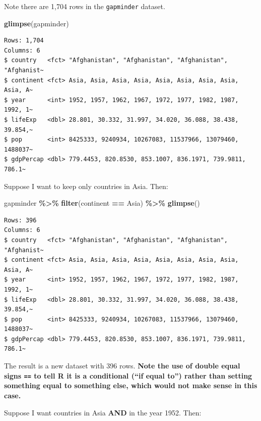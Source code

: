 \documentclass[
]{book}
\makeatletter
\newenvironment{Shaded}{\begin{snugshade}}{\end{snugshade}}
\newcommand{\FunctionTok}[1]{\textcolor[rgb]{0.27,0.27,0.27}{\textbf{#1}}}
\newcommand{\NormalTok}[1]{#1}
\newcommand{\SpecialCharTok}[1]{\textcolor[rgb]{0.43,0.43,0.43}{\textbf{#1}}}
\newcommand{\StringTok}[1]{\textcolor[rgb]{0.5,0.5,0.5}{#1}}
\newenvironment{kframe}{%
\medskip{}
\setlength{\fboxsep}{.8em}
 \def\at@end@of@kframe{}%
 \ifinner\ifhmode%
  \def\at@end@of@kframe{\end{minipage}}%
  \begin{minipage}{\columnwidth}%
 \fi\fi%
 \def\FrameCommand##1{\hskip\@totalleftmargin \hskip-\fboxsep
 \colorbox{shadecolor}{##1}\hskip-\fboxsep
     \hskip-\linewidth \hskip-\@totalleftmargin \hskip\columnwidth}%
 \MakeFramed {\advance\hsize-\width
   \@totalleftmargin\z@ \linewidth\hsize
   \@setminipage}}%
 {\par\unskip\endMakeFramed%
 \at@end@of@kframe}
\renewenvironment{Shaded}{\begin{kframe}}{\end{kframe}}
\makeatother
\begin{document}
Note there are 1,704 rows in the \texttt{gapminder} dataset.

\begin{Shaded}
\begin{Highlighting}[]
\FunctionTok{glimpse}\NormalTok{(gapminder)}
\end{Highlighting}
\end{Shaded}

\begin{verbatim}
Rows: 1,704
Columns: 6
$ country   <fct> "Afghanistan", "Afghanistan", "Afghanistan", "Afghanist~
$ continent <fct> Asia, Asia, Asia, Asia, Asia, Asia, Asia, Asia, Asia, A~
$ year      <int> 1952, 1957, 1962, 1967, 1972, 1977, 1982, 1987, 1992, 1~
$ lifeExp   <dbl> 28.801, 30.332, 31.997, 34.020, 36.088, 38.438, 39.854,~
$ pop       <int> 8425333, 9240934, 10267083, 11537966, 13079460, 1488037~
$ gdpPercap <dbl> 779.4453, 820.8530, 853.1007, 836.1971, 739.9811, 786.1~
\end{verbatim}

Suppose I want to keep only countries in Asia. Then:

\begin{Shaded}
\begin{Highlighting}[]
\NormalTok{gapminder }\SpecialCharTok{\%\textgreater{}\%} 
  \FunctionTok{filter}\NormalTok{(continent }\SpecialCharTok{==} \StringTok{\textquotesingle{}Asia\textquotesingle{}}\NormalTok{) }\SpecialCharTok{\%\textgreater{}\%} 
  \FunctionTok{glimpse}\NormalTok{()}
\end{Highlighting}
\end{Shaded}

\begin{verbatim}
Rows: 396
Columns: 6
$ country   <fct> "Afghanistan", "Afghanistan", "Afghanistan", "Afghanist~
$ continent <fct> Asia, Asia, Asia, Asia, Asia, Asia, Asia, Asia, Asia, A~
$ year      <int> 1952, 1957, 1962, 1967, 1972, 1977, 1982, 1987, 1992, 1~
$ lifeExp   <dbl> 28.801, 30.332, 31.997, 34.020, 36.088, 38.438, 39.854,~
$ pop       <int> 8425333, 9240934, 10267083, 11537966, 13079460, 1488037~
$ gdpPercap <dbl> 779.4453, 820.8530, 853.1007, 836.1971, 739.9811, 786.1~
\end{verbatim}

The result is a new dataset with 396 rows. \textbf{Note the use of double equal signs \texttt{==} to tell R it is a conditional (``if equal to'') rather than setting something equal to something else, which would not make sense in this case.}

Suppose I want countries in Asia \textbf{AND} in the year 1952. Then:
\end{document}
